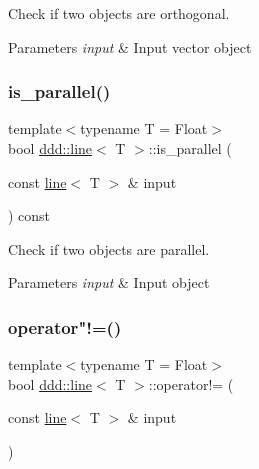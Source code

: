 Check if two objects are orthogonal. 


\begin{DoxyParams}{Parameters}
{\em input} & Input vector object \\
\hline
\end{DoxyParams}
\mbox{\label{classddd_1_1line_aba281798b6743c8bbab01df3613325ac}} 
\subsubsection{\texorpdfstring{is\+\_\+parallel()}{is\_parallel()}}
{\footnotesize\ttfamily template$<$typename T = Float$>$ \\
bool \hyperlink{classddd_1_1line}{ddd\+::line}$<$ T $>$\+::is\+\_\+parallel (\begin{DoxyParamCaption}\item[{const \hyperlink{classddd_1_1line}{line}$<$ T $>$ \&}]{input }\end{DoxyParamCaption}) const\hspace{0.3cm}{\ttfamily [inline]}}



Check if two objects are parallel. 


\begin{DoxyParams}{Parameters}
{\em input} & Input object \\
\hline
\end{DoxyParams}
\mbox{\label{classddd_1_1line_a1ff398ce69c656f9f51fc307f0753d10}} 
\subsubsection{\texorpdfstring{operator"!=()}{operator!=()}}
{\footnotesize\ttfamily template$<$typename T = Float$>$ \\
bool \hyperlink{classddd_1_1line}{ddd\+::line}$<$ T $>$\+::operator!= (\begin{DoxyParamCaption}\item[{const \hyperlink{classddd_1_1line}{line}$<$ T $>$ \&}]{input }\end{DoxyParamCaption})\hspace{0.3cm}{\ttfamily [inline]}}



